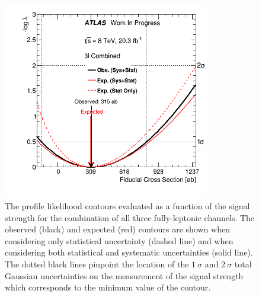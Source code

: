 
\begin{figure}[ht!]
\centering
\includegraphics[width=0.8\textwidth]{figures/statistics/measurement/interval/combination.png}
\caption{The profile likelihood contours evaluated as a function of 
the signal strength
for the combination of all three fully-leptonic channels. 
The observed (black) and expected (red) contours are shown when 
considering only statistical uncertainty (dashed line) and when considering both statistical and systematic uncertainties (solid line).
The dotted black
lines pinpoint the location of the $1~\sigma$ and $2~\sigma$ total 
Gaussian uncertainties
on the measurement of the signal strength which corresponds to the 
minimum value of the contour.}
\label{fig:stat_measurement_interval_combination}
\end{figure}


